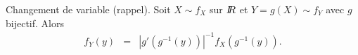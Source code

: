 \begin{rep}
\begin{proposition}{Changement de variable (rappel).}\label{changement.var}
Soit $X\sim f_X$ sur $I\!\!R$ et $Y=g(X)\sim f_Y$ avec $g$ bijectif. Alors
\begin{eqnarray*}
f_Y(y) & = & \left|g'(g^{-1}(y))\right|^{-1} f_X(g^{-1}(y)).
\end{eqnarray*}
\end{proposition}

\end{rep}